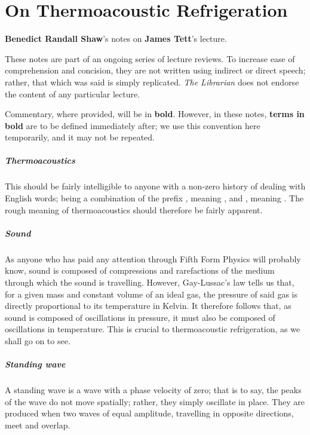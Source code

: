 \chapter{On Thermoacoustic Refrigeration}

\hspace{\fill}\textbf{Benedict Randall Shaw}'s notes on \textbf{James Tett}'s lecture.

\begin{multicols}{2}
	
These notes are part of an ongoing series of lecture reviews. To increase ease of comprehension and concision, they are not written using indirect or direct speech; rather, that which was said is simply replicated. \textit{The Librarian} does not endorse the content of any particular lecture.

Commentary, where provided, will be in \textbf{bold}. However, in these notes, \textbf{terms in bold} are to be defined immediately after; we use this convention here temporarily, and it may not be repeated.

\paragraph{Thermoacoustics} This should be fairly intelligible to anyone with a non-zero history of dealing with English words; being a combination of the prefix , meaning , and , meaning . The rough meaning of thermoacoustics should therefore be fairly apparent.

\paragraph{Sound} As anyone who has paid any attention through Fifth Form Physics will probably know, sound is composed of compressions and rarefactions of the medium through which the sound is travelling. However, Gay-Lussac's law tells us that, for a given mass and constant volume of an ideal gas, the pressure of said gas is directly proportional to its temperature in Kelvin. It therefore follows that, as sound is composed of oscillations in pressure, it must also be composed of oscillations in temperature. This is crucial to thermoacoustic refrigeration, as we shall go on to see.

\paragraph{Standing wave} A standing wave is a wave with a phase velocity of zero; that is to say, the peaks of the wave do not move spatially; rather, they simply oscillate in place. They are produced when two waves of equal amplitude, travelling in opposite directions, meet and overlap.


\end{multicols}
